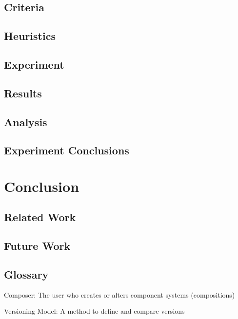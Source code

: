 \documentclass{report}
\begin{document}
\section{Criteria}

\section{Heuristics}

\section{Experiment}
\section{Results}
\section{Analysis}
\section{Experiment Conclusions}

\chapter{Conclusion}
\section{Related Work}
\section{Future Work}

\section{Glossary}
Composer: The user who creates or alters component systems (compositions)

Versioning Model: A method to define and compare versions
\end{document}
